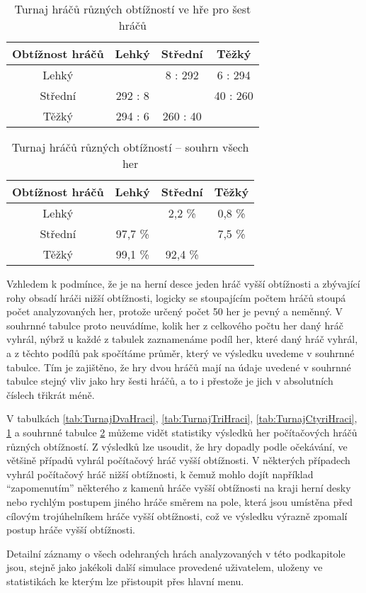 \begin{table}
	\centering
	\caption{Turnaj hráčů různých obtížností ve hře pro šest hráčů}
	\label{tab:TurnajSestHracu}
	\begin{tabular}{cccc}
		\toprule
		Obtížnost hráčů & \multicolumn{1}{c}{Lehký} & \multicolumn{1}{c}{Střední} & \multicolumn{1}{c}{Těžký}\\
		\midrule
		Lehký & \faTimes & 8 : 292 & 6 : 294\\
		Střední & 292 : 8 & \faTimes & 40 : 260\\
		Těžký & 294 : 6 & 260 : 40 & \faTimes\\
		\bottomrule
	\end{tabular}
\end{table}

\begin{table}
	\centering
	\caption{Turnaj hráčů různých obtížností -- souhrn všech her}
	\label{tab:TurnajSouhrn}
	\begin{tabular}{cccc}
		\toprule
		Obtížnost hráčů & \multicolumn{1}{c}{Lehký} & \multicolumn{1}{c}{Střední} & \multicolumn{1}{c}{Těžký}\\
		\midrule
		Lehký & \faTimes & 2,2 \% & 0,8 \%\\
		Střední & 97,7 \% & \faTimes & 7,5 \%\\
		Těžký & 99,1 \% & 92,4 \% & \faTimes\\
		\bottomrule
	\end{tabular}
\end{table}

Vzhledem k podmínce, že je na herní desce jeden hráč vyšší obtížnosti a zbývající rohy obsadí hráči nižší obtížnosti, logicky se stoupajícím počtem hráčů stoupá počet analyzovaných her, protože určený počet 50 her je pevný a neměnný. V souhrnné tabulce proto neuvádíme, kolik her z celkového počtu her daný hráč vyhrál, nýbrž u každé z tabulek zaznamenáme podíl her, které daný hráč vyhrál, a z těchto podílů pak spočítáme průměr, který ve výsledku uvedeme v souhrnné tabulce. Tím je zajištěno, že hry dvou hráčů mají na údaje uvedené v souhrnné tabulce stejný vliv jako hry šesti hráčů, a to i přestože je jich v absolutních číslech třikrát méně.

V tabulkách \ref{tab:TurnajDvaHraci}, \ref{tab:TurnajTriHraci}, \ref{tab:TurnajCtyriHraci}, \ref{tab:TurnajSestHracu} a souhrnné tabulce \ref{tab:TurnajSouhrn} můžeme vidět statistiky výsledků her počítačových hráčů různých obtížností. Z výsledků lze usoudit, že hry dopadly podle očekávání, ve většině případů vyhrál počítačový hráč vyšší obtížnosti. V některých případech vyhrál počítačový hráč nižší obtížnosti, k čemuž mohlo dojít například \enquote{zapomenutím} některého z kamenů hráče vyšší obtížnosti na kraji herní desky nebo rychlým postupem jiného hráče směrem na pole, která jsou umístěna před cílovým trojúhelníkem hráče vyšší obtížnosti, což ve výsledku výrazně zpomalí postup hráče vyšší obtížnosti.

Detailní záznamy o všech odehraných hrách analyzovaných v této podkapitole jsou, stejně jako jakékoli další simulace provedené uživatelem, uloženy ve statistikách ke kterým lze přistoupit přes hlavní menu. 
\endinput